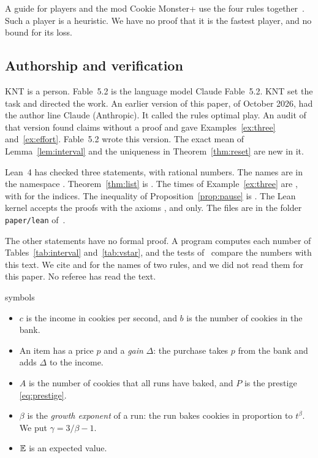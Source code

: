 \documentclass[11pt]{article}
\theoremstyle{boxed}
\begin{document}
A guide for players and the mod Cookie Monster+ use the four rules together~\cite{Repo}. Such a
player is a heuristic. We have no proof that it is the fastest player, and no bound for its
loss.

\subsection{Authorship and verification}\label{sec:status}

KNT is a person. Fable~5.2 is the language model Claude Fable~5.2. KNT set the task and directed
the work. An earlier version of this paper, of October 2026, had the author line Claude
(Anthropic). It called the rules optimal play. An audit of that version found claims without a
proof and gave Examples~\ref{ex:three} and~\ref{ex:effort}. Fable~5.2 wrote this version. The
exact mean of Lemma~\ref{lem:interval} and the uniqueness in Theorem~\ref{thm:reset} are new in
it.

Lean~4 has checked three statements, with rational numbers. The names are in the namespace
. Theorem~\ref{thm:list} is . The times of
Example~\ref{ex:three} are , with
 for the indices. The inequality of
Proposition~\ref{prop:pause} is . The Lean kernel accepts the
proofs with the axioms ,  and  only. The
files are in the folder \texttt{paper/lean} of~\cite{Repo}.

The other statements have no formal proof. A program computes each number of
Tables~\ref{tab:interval} and~\ref{tab:vstar}, and the tests of~\cite{Repo} compare the numbers
with this text. We cite \cite{Charnov} and \cite{Smith} for the names of two rules, and we did
not read them for this paper. No referee has read the text.

\begin{notation}{symbols}
\begin{itemize}[leftmargin=1.2em]
\item $c$ is the income in cookies per second, and $b$ is the number of cookies in the bank.
\item An item has a price $p$ and a \emph{gain} $\Delta$: the purchase takes $p$ from the bank
and adds $\Delta$ to the income.
\item $A$ is the number of cookies that all runs have baked, and $P$ is the prestige
\eqref{eq:prestige}.
\item $\beta$ is the \emph{growth exponent} of a run: the run bakes cookies in proportion to
$t^{\beta}$. We put $\gamma=3/\beta-1$.
\item $\mathbb{E}$ is an expected value.
\end{itemize}
\end{notation}
\end{document}
